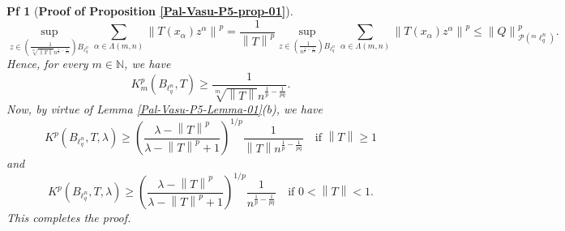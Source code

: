 \documentclass[10pt,a4paper]{amsart}
\newtheorem{pf}{Pf}
\newcommand{\norm}[1]{\left\lVert#1\right\rVert}
\begin{document}
\begin{pf}[{\bf Proof of Proposition \ref{Pal-Vasu-P5-prop-01}}]
\begin{equation*}
	\sup_{z\in \left(\frac{1}{\sqrt[m]{\norm{T}}n^{\frac{1}{p}-\frac{1}{pq}}}\right)B_{\ell^n_q}} \sum_{\alpha \in\Lambda(m,n)}\norm{T(x_{\alpha})z^{\alpha}}^p=
	\frac{1}{\norm{T}^p} \sup_{z\in \left(\frac{1}{n^{\frac{1}{p}-\frac{1}{pq}}}\right)B_{\ell^n_q}} \sum_{\alpha \in\Lambda(m,n)}\norm{T(x_{\alpha})z^{\alpha}}^p\leq \norm{Q}^p_{\mathcal{P}(^m\ell^n_q)}.
\end{equation*}
Hence, for every $m\in \mathbb{N}$, we have 
\begin{equation*}
	K^p_m(B_{\ell^n_q},T)\geq \frac{1}{\sqrt[m]{\norm{T}}n^{\frac{1}{p}-\frac{1}{pq}}}.
\end{equation*}
Now, by virtue of Lemma \ref{Pal-Vasu-P5-Lemma-01}(b), we have 
\begin{equation*}
	K^p(B_{\ell^n_q},T,\lambda)\geq \left(\frac{\lambda-\norm{T}^p}{\lambda-\norm{T}^p+1}\right)^{1/p} \frac{1}{\norm{T}n^{\frac{1}{p}-\frac{1}{pq}}} \quad \mbox{if}\,\, \norm{T}\geq 1
\end{equation*}
and 
\begin{equation*}
	K^p(B_{\ell^n_q},T,\lambda)\geq \left(\frac{\lambda-\norm{T}^p}{\lambda-\norm{T}^p+1}\right)^{1/p} \frac{1}{n^{\frac{1}{p}-\frac{1}{pq}}} \quad \mbox{if}\,\, 0<\norm{T}< 1.
\end{equation*}
This completes the proof.
\end{pf}
\end{document}
